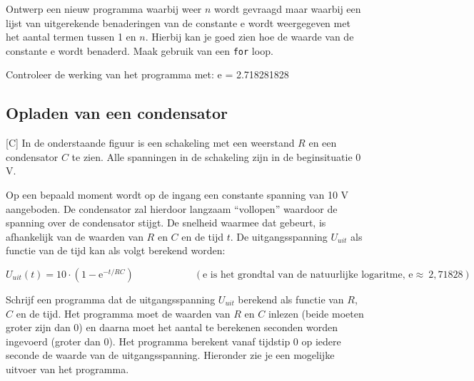 \documentclass[a4paper,10pt,fleqn,twoside]{article}
\begin{document}
Ontwerp een nieuw programma waarbij weer $n$ wordt gevraagd maar waarbij een lijst van uitgerekende benaderingen van de constante e wordt weergegeven met het aantal termen tussen 1 en $n$. Hierbij kan je goed zien hoe de waarde van de constante e wordt benaderd. Maak gebruik van een \lstinline|for| loop.

Controleer de werking van het programma met: e = 2.718281828

\subsection{Opladen van een condensator}[C]
In de onderstaande figuur is een  schakeling met een weerstand $R$ en een condensator $C$ te zien.
Alle spanningen in de schakeling zijn in de beginsituatie 0 V.

\begin{figure}[H]
\centering
{}
\end{figure}

Op een bepaald moment wordt op de ingang een constante spanning van 10 V aangeboden. De condensator zal hierdoor langzaam ``vollopen'' waardoor de spanning over de condensator stijgt. De snelheid waarmee dat gebeurt, is afhankelijk van de waarden van $R$ en $C$ en de tijd $t$.
De uitgangsspanning $U_{uit}$ als functie van de tijd kan als volgt berekend worden:

\begin{equation*}
U_{uit}(t) = 10\cdot(1-\mathrm{e}^{-t/RC}) \qquad\qquad\qquad (\text{e is het grondtal van de natuurlijke logaritme, e}\approx\ 2,71828)
\end{equation*}


Schrijf een programma dat de uitgangsspanning $U_{uit}$ berekend als functie van $R$, $C$ en de tijd. Het programma moet de waarden van $R$ en $C$ inlezen (beide moeten groter zijn dan 0) en daarna moet het aantal te berekenen seconden worden ingevoerd (groter dan 0). Het programma berekent vanaf tijdstip 0 op iedere seconde de waarde van de uitgangsspanning. Hieronder zie je een mogelijke uitvoer van het programma.
\end{document}

